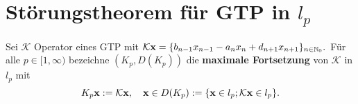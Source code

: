 





\section{Störungstheorem für GTP in $l_p$}

\begin{konstr}
Sei $\mathcal K$ Operator eines GTP mit $
\mathcal K\textnormal{\textbf{x}}=\{b_{n-1}x_{n-1} -a_nx_n + d_{n+1}x_{n+1}\}_{n\in\mathbb{N}_0}.$ Für alle $p\in[1,\infty)$ bezeichne $(K_p, D(K_p))$ die \textbf{maximale Fortsetzung} von $\mathcal K$ in $l_p$ mit
\begin{equation*}
K_p\textnormal{\textbf{x}}:= \mathcal K\textnormal{\textbf{x}},\quad \textbf{x}\in D(K_p):=\{\textnormal{\textbf{x}}\in l_p; \mathcal K\textnormal{\textbf{x}} \in l_p\}.
\end{equation*}
\end{konstr}


